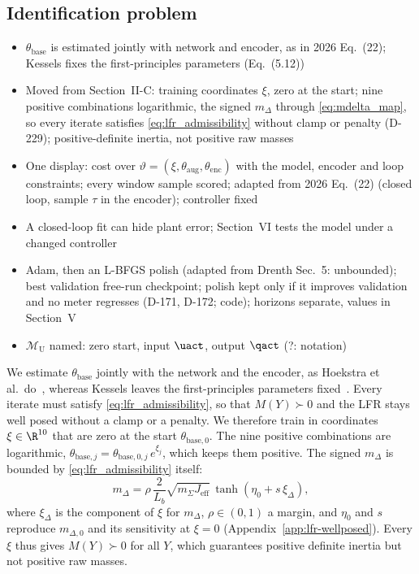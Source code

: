 \subsection{Identification problem}\label{sec:aug_closed_loop}
\ifdraft
\begin{itemize}
\item $\theta_{\mathrm{base}}$ is estimated jointly with network and encoder, as in 2026 Eq.~(22); Kessels fixes the first-principles parameters (Eq.~(5.12))
\item Moved from Section~II-C: training coordinates $\xi$, zero at the start; nine positive combinations logarithmic, the signed $m_\Delta$ through \eqref{eq:mdelta_map}, so every iterate satisfies \eqref{eq:lfr_admissibility} without clamp or penalty (D-229); positive-definite inertia, not positive raw masses
\item One display: cost over $\vartheta=(\xi,\theta_{\mathrm{aug}},\theta_{\mathrm{enc}})$ with the model, encoder and loop constraints; every window sample scored; adapted from 2026 Eq.~(22) (closed loop, sample $\tau$ in the encoder); controller fixed
\item A closed-loop fit can hide plant error; Section~VI tests the model under a changed controller
\item Adam, then an L-BFGS polish (adapted from Drenth Sec.~5: unbounded); best validation free-run checkpoint; polish kept only if it improves validation and no meter regresses (D-171, D-172; code); horizons separate, values in Section~V
\item $\mathcal M_{\mathrm U}$ named: zero start, input $\uact$, output $\qact$ (?: notation)
\end{itemize}
\fi

We estimate $\theta_{\mathrm{base}}$ jointly with the network and the encoder,
as Hoekstra et al.\ do~\cite[Eq.~(22)]{hoekstra2026lfr}, whereas Kessels
leaves the first-principles parameters fixed~\cite[Eq.~(5.12)]{kessels2025ai}.
Every iterate must satisfy \eqref{eq:lfr_admissibility}, so that $M(Y)\succ0$
and the LFR stays well posed without a clamp or a penalty.
We therefore train in coordinates $\xi\in\R^{10}$ that are zero at the start
$\theta_{\mathrm{base},0}$.
The nine positive combinations are logarithmic,
$\theta_{\mathrm{base},j}=\theta_{\mathrm{base},0,j}\,e^{\xi_j}$, which keeps
them positive.
The signed $m_\Delta$ is bounded by \eqref{eq:lfr_admissibility} itself:
\begin{equation}
  m_\Delta=\rho\,\frac{2}{L_b}\sqrt{m_\Sigma J_{\mathrm{eff}}}\,\tanh(\eta_0+s\,\xi_\Delta),
  \label{eq:mdelta_map}
\end{equation}
where $\xi_\Delta$ is the component of $\xi$ for $m_\Delta$, $\rho\in(0,1)$ a
margin, and $\eta_0$ and $s$ reproduce $m_{\Delta,0}$ and its sensitivity at
$\xi=0$ (Appendix~\ref{app:lfr-wellposed}).
Every $\xi$ thus gives $M(Y)\succ0$ for all $Y$, which guarantees positive
definite inertia but not positive raw masses.

